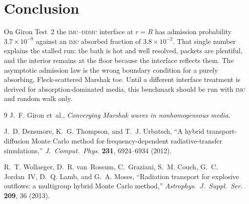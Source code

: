 \documentclass[11pt]{article}
\newcommand{\imc}{\textsc{imc}}
\newcommand{\ddmc}{\textsc{ddmc}}
\begin{document}
\section{Conclusion}

On Giron Test~2 the \imc--\ddmc{} interface at $r=R$ has admission probability $3.7\times 10^{-9}$ against an \imc{} absorbed fraction of $3.8\times 10^{-2}$.
That single number explains the stalled run: the bath is hot and well resolved, packets are plentiful, and the interior remains at the floor because the interface reflects them.
The asymptotic admission law is the wrong boundary condition for a purely absorbing, Fleck-scattered Marshak toe.
Until a different interface treatment is derived for absorption-dominated media, this benchmark should be run with \imc{} and random walk only.

\begin{thebibliography}{9}
J.~F. Giron et~al.,
\textit{Converging Marshak waves in nonhomogeneous media}.

J.~D. Densmore, K.~G. Thompson, and T.~J. Urbatsch,
``A hybrid transport-diffusion Monte Carlo method for frequency-dependent radiative-transfer simulations,''
\textit{J.\ Comput.\ Phys.} \textbf{231}, 6924--6934 (2012).

R.~T. Wollaeger, D.~R. van~Rossum, C.~Graziani, S.~M. Couch, G.~C. Jordan~IV, D.~Q. Lamb, and G.~A. Moses,
``Radiation transport for explosive outflows: a multigroup hybrid Monte Carlo method,''
\textit{Astrophys.\ J.\ Suppl.\ Ser.} \textbf{209}, 36 (2013).
\end{thebibliography}
\end{document}
